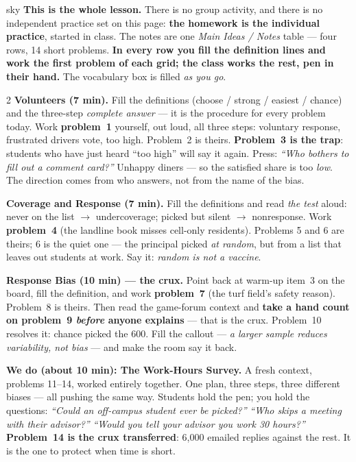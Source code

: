 \documentclass[10pt]{article}
\begin{document}
\boxguard
\begin{skillbox}{sky}
\textbf{This is the whole lesson.} There is no group activity, and there is no independent
practice set on this page: \textbf{the homework is the individual practice}, started in class.
The notes are one \emph{Main Ideas / Notes} table --- four rows, 14 short problems.
\textbf{In every row you fill the definition lines and work the first problem of each grid; the
class works the rest, pen in their hand.} The vocabulary box is filled \emph{as you go}.
\begin{multicols}{2}
\textbf{Volunteers (7 min).} Fill the definitions (choose / strong / easiest / chance) and the
three-step \emph{complete answer} --- it is the procedure for every problem today. Work
\textbf{problem~1} yourself, out loud, all three steps: voluntary response, frustrated drivers
vote, too high. Problem~2 is theirs. \textbf{Problem~3 is the trap}: students who have just
heard ``too high'' will say it again. Press: \emph{``Who bothers to fill out a comment card?''}
Unhappy diners --- so the satisfied share is too \emph{low}. The direction comes from who
answers, not from the name of the bias.

\textbf{Coverage and Response (7 min).} Fill the definitions and read \emph{the test} aloud:
never on the list $\to$ undercoverage; picked but silent $\to$ nonresponse. Work
\textbf{problem~4} (the landline book misses cell-only residents). Problems 5 and 6 are
theirs; 6 is the quiet one --- the principal picked \emph{at random}, but from a list that
leaves out students at work. Say it: \emph{random is not a vaccine}.

\textbf{Response Bias (10 min) --- the crux.} Point back at warm-up item~3 on the board, fill
the definition, and work \textbf{problem~7} (the turf field's safety reason). Problem~8 is
theirs. Then read the game-forum context and \textbf{take a hand count on problem~9
\emph{before} anyone explains} --- that is the crux. Problem~10 resolves it: chance picked the
600. Fill the callout --- \emph{a larger sample reduces variability, not bias} --- and make the
room say it back.

\columnbreak
\textbf{We do (about 10 min): The Work-Hours Survey.} A fresh context, problems 11--14, worked
entirely together. One plan, three steps, three different biases --- all pushing the same way.
Students hold the pen; you hold the questions: \emph{``Could an off-campus student ever be
picked?''} \quad \emph{``Who skips a meeting with their advisor?''} \quad \emph{``Would you
tell your advisor you work 30 hours?''} \textbf{Problem~14 is the crux transferred}: 6{,}000
emailed replies against the rest. It is the one to protect when time is short.


\end{multicols}
\end{skillbox}
\end{document}
